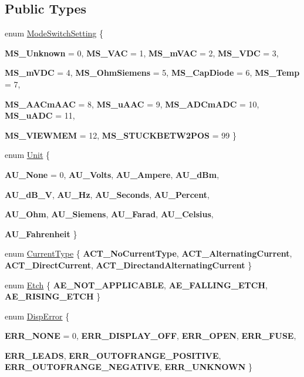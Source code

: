 \subsection*{Public Types}
\begin{DoxyCompactItemize}
\item 
enum \hyperlink{classFluke_1_1Fluke189DataResponseAnalyzerWrapper_a2ec2700a6086ae0ebd9601fe0c0f957a}{ModeSwitchSetting} \{ \par
{\bfseries MS\_\-Unknown} = 0, 
{\bfseries MS\_\-VAC} = 1, 
{\bfseries MS\_\-mVAC} = 2, 
{\bfseries MS\_\-VDC} = 3, 
\par
{\bfseries MS\_\-mVDC} = 4, 
{\bfseries MS\_\-OhmSiemens} = 5, 
{\bfseries MS\_\-CapDiode} = 6, 
{\bfseries MS\_\-Temp} = 7, 
\par
{\bfseries MS\_\-AACmAAC} = 8, 
{\bfseries MS\_\-uAAC} = 9, 
{\bfseries MS\_\-ADCmADC} = 10, 
{\bfseries MS\_\-uADC} = 11, 
\par
{\bfseries MS\_\-VIEWMEM} = 12, 
{\bfseries MS\_\-STUCKBETW2POS} = 99
 \}
\item 
enum \hyperlink{classFluke_1_1Fluke189DataResponseAnalyzerWrapper_ab8e5f2306e4d2ad3d741d273793aaed1}{Unit} \{ \par
{\bfseries AU\_\-None} = 0, 
{\bfseries AU\_\-Volts}, 
{\bfseries AU\_\-Ampere}, 
{\bfseries AU\_\-dBm}, 
\par
{\bfseries AU\_\-dB\_\-V}, 
{\bfseries AU\_\-Hz}, 
{\bfseries AU\_\-Seconds}, 
{\bfseries AU\_\-Percent}, 
\par
{\bfseries AU\_\-Ohm}, 
{\bfseries AU\_\-Siemens}, 
{\bfseries AU\_\-Farad}, 
{\bfseries AU\_\-Celsius}, 
\par
{\bfseries AU\_\-Fahrenheit}
 \}
\item 
enum \hyperlink{classFluke_1_1Fluke189DataResponseAnalyzerWrapper_afef24496da239e3613c40ad3582d7adc}{CurrentType} \{ {\bfseries ACT\_\-NoCurrentType}, 
{\bfseries ACT\_\-AlternatingCurrent}, 
{\bfseries ACT\_\-DirectCurrent}, 
{\bfseries ACT\_\-DirectandAlternatingCurrent}
 \}
\item 
enum \hyperlink{classFluke_1_1Fluke189DataResponseAnalyzerWrapper_ada71f6ab32a7b0eb40bb0ed96d7053bc}{Etch} \{ {\bfseries AE\_\-NOT\_\-APPLICABLE}, 
{\bfseries AE\_\-FALLING\_\-ETCH}, 
{\bfseries AE\_\-RISING\_\-ETCH}
 \}
\item 
enum \hyperlink{classFluke_1_1Fluke189DataResponseAnalyzerWrapper_a5e26140c615bf0b73788f665a7bec9c7}{DispError} \{ \par
{\bfseries ERR\_\-NONE} = 0, 
{\bfseries ERR\_\-DISPLAY\_\-OFF}, 
{\bfseries ERR\_\-OPEN}, 
{\bfseries ERR\_\-FUSE}, 
\par
{\bfseries ERR\_\-LEADS}, 
{\bfseries ERR\_\-OUTOFRANGE\_\-POSITIVE}, 
{\bfseries ERR\_\-OUTOFRANGE\_\-NEGATIVE}, 
{\bfseries ERR\_\-UNKNOWN}
 \}
\end{DoxyCompactItemize}
